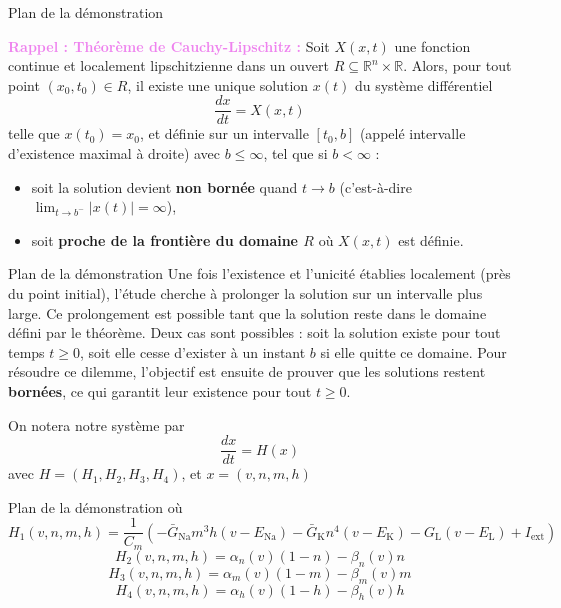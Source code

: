 \documentclass[10pt,french]{beamer}
\begin{document}
	\begin{frame}{Plan de la démonstration}
		\begin{boxH}
			\textbf{\textcolor{violet}{Rappel : Théorème de Cauchy-Lipschitz :}}
			Soit $X(x,t)$ une fonction continue et localement lipschitzienne dans un ouvert $R \subseteq \mathbb{R}^n \times \mathbb{R}$. Alors, pour tout point $(x_0, t_0) \in R$, il existe une unique solution $x(t)$ du système différentiel
			\[
			\frac{dx}{dt} = X(x,t)
			\]
			telle que $x(t_0) = x_0$, et définie sur un intervalle $[t_0, b]$ (appelé intervalle d'existence maximal à droite) avec $b \leq \infty$, tel que si $b < \infty$ :
			\begin{itemize}
				\item[-] soit la solution devient \textbf{non bornée} quand $t \rightarrow b$ (c'est-à-dire $\lim_{t \to b^-} |x(t)| = \infty$), 
				\item[-] soit \textbf{proche de la frontière du domaine $R$} où $X(x,t)$ est définie.
			\end{itemize}
		\end{boxH}
	\end{frame}
	\begin{frame}{Plan de la démonstration}
		Une fois l’existence et l’unicité établies localement (près du point initial), l’étude cherche à prolonger la solution sur un intervalle plus large. Ce prolongement est possible tant que la solution reste dans le domaine défini par le théorème. Deux cas sont possibles : soit la solution existe pour tout temps $t \geq 0$, soit elle cesse d’exister à un instant $b$ si elle quitte ce domaine. Pour résoudre ce dilemme, l’objectif est ensuite de prouver que les solutions restent \textbf{bornées}, ce qui garantit leur existence pour tout $t \geq 0$.
		
		On notera notre système par
		\begin{equation}
			\frac{dx}{dt}=H(x)
			\label{eq:20}
		\end{equation}
		avec $H=(H_1, H_2, H_3,H_4)$, et $x=(v,n,m,h)$
	\end{frame}
	\begin{frame}{Plan de la démonstration}
		où
		\[
		H_1(v, n, m, h) = \frac{1}{C_m}(-\bar{G}_{\text{Na}} m^3 h (v - E_{\text{Na}}) - \bar{G}_{\text{K}} n^4 (v - E_{\text{K}}) - G_{\text{L}} (v - E_{\text{L}}) + I_{\text{ext}})
		\]
		\[
		H_2(v, n, m, h) = \alpha_n(v)(1 - n) - \beta_n(v)n
		\]
		\[
		H_3(v, n, m, h) = \alpha_m(v)(1 - m) - \beta_m(v)m
		\]
		\[
		H_4(v, n, m, h) = \alpha_h(v)(1 - h) - \beta_h(v)h
		\]
	\end{frame}
	
\end{document}
